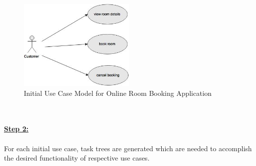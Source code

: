 \begin{figure}[H]
\begin{center}
\includegraphics[width=0.5\textwidth]{figures/use-case-two}
\caption{Initial Use Case Model for Online Room Booking Application}
\label{fig:selection_by_use_case/use_case_two}
\end{center}
\end{figure}
\\
\\
\textbf{\underline{Step 2:}}
\\
\\
For each initial use case, task trees are generated which are needed to accomplish the desired functionality of respective use cases.
\\
